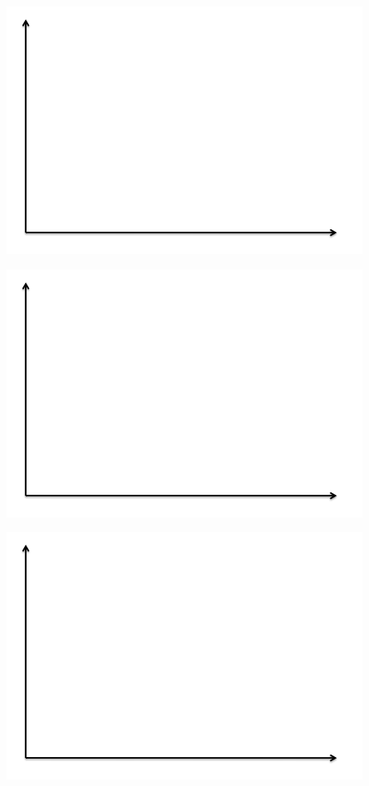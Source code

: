 \documentclass[12pt,english]{article}
\begin{document}
\newpage
\begin{center}
\begin{adjustbox}{
		max width=0.65\textwidth,
	}
\includegraphics{axes.png}
\end{adjustbox}
\begin{adjustbox}{
		max width=0.65\textwidth,
	}
	\includegraphics{axes.png}
\end{adjustbox}
\begin{adjustbox}{
		max width=0.65\textwidth,
	}
	\includegraphics{axes.png}
\end{adjustbox}
\end{center}
\end{document}
